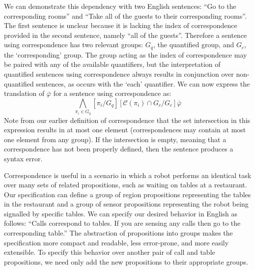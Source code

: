 We can demonstrate this dependency with two English sentences: ``Go to the corresponding rooms'' and ``Take all of the guests to their corresponding rooms''.
The first sentence is unclear because it is lacking the index of correspondence provided in the second sentence, namely ``all of the guests''. 
Therefore a sentence using correspondence has two relevant groups: $G_q$, the quantified group, and $G_c$, the `corresponding' group. 
The group acting as the index of correspondence may be paired with any of the available quantifiers, but the interpretation of quantified sentences using correspondence always results in conjunction over non-quantified sentences, as occurs with the `each' quantifier. 
We can now express the translation of $\bar{\varphi}$ for a sentence using correspondence as:
\begin{equation*}
	\bigwedge \limits_{\pi_i \in G_q} [\pi_i / G_q] [\mathcal{C}(\pi_i) \cap G_c / G_c] \bar{\varphi}
\end{equation*}
Note from our earlier definition of correspondence that the set intersection in this expression results in at most one element (correspondences may contain at most one element from any group). 
If the intersection is empty, meaning that a correspondence has not been properly defined, then the sentence produces a syntax error. 

\begin{myExample}\label{Ex:corresponding}
	Correspondence is useful in a scenario in which a robot performs an identical task over many sets of related propositions, such as waiting on tables at a restaurant. 
	Our specification can define a group of region propositions representing the tables in the restaurant and a group of sensor propositions representing the robot being signalled by specific tables. We can specify our desired behavior in English as follows: 
	``Calls correspond to tables. 
	If you are sensing any calls then go to the corresponding table.''
	The abstraction of propositions into groups makes the specification more compact and readable, less error-prone, and more easily extensible. 
	To specify this behavior over another pair of call and table propositions, we need only add the new propositions to their appropriate groups. 
\end{myExample}

